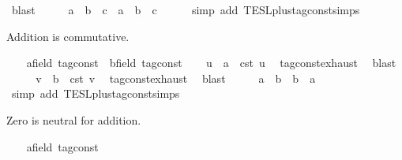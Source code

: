 \begin{isabellebody}
\ blast\isanewline
\ \ \isamarkupfalse%
\ \isamarkupfalse%
\ {\isacartoucheopen}a\ {\isacharplus}\ b\ {\isacharplus}\ c\ {\isacharequal}\ a\ {\isacharplus}\ {\isacharparenleft}b\ {\isacharplus}\ c{\isacharparenright}{\isacartoucheclose}\isanewline
\ \ \ \ \isamarkupfalse%
\ {\isacharparenleft}simp\ add{\isacharcolon}\ TESL{\isachardot}plus{\isacharunderscore}tag{\isacharunderscore}const{\isachardot}simps{\isacharparenright}\isanewline
{}\isamarkupfalse%
%
\begin{isamarkuptext}%
Addition is commutative.%
\end{isamarkuptext}\isamarkuptrue%
\ \ \isamarkupfalse%
\ a{\isacharcolon}{\isacharcolon}{\isacartoucheopen}{\isacharprime}{\isasymtau}{\isacharcolon}{\isacharcolon}field\ tag{\isacharunderscore}const{\isacartoucheclose}\ \ b{\isacharcolon}{\isacharcolon}{\isacartoucheopen}{\isacharprime}{\isasymtau}{\isacharcolon}{\isacharcolon}field\ tag{\isacharunderscore}const{\isacartoucheclose}\isanewline
\ \ \isamarkupfalse%
\ u\ \ {\isacartoucheopen}a\ {\isacharequal}\ {\isasymtau}\isactrlsub c\isactrlsub s\isactrlsub t\ u{\isacartoucheclose}\ \isamarkupfalse%
\ tag{\isacharunderscore}const{\isachardot}exhaust\ \isamarkupfalse%
\ blast\isanewline
\ \ \isamarkupfalse%
\ \isamarkupfalse%
\ v\ \ {\isacartoucheopen}b\ {\isacharequal}\ {\isasymtau}\isactrlsub c\isactrlsub s\isactrlsub t\ v{\isacartoucheclose}\ \isamarkupfalse%
\ tag{\isacharunderscore}const{\isachardot}exhaust\ \isamarkupfalse%
\ blast\isanewline
\ \ \isamarkupfalse%
\ \isamarkupfalse%
\ {\isacartoucheopen}a\ {\isacharplus}\ b\ {\isacharequal}\ b\ {\isacharplus}\ a{\isacartoucheclose}\isanewline
\ \ \ \ \isamarkupfalse%
\ {\isacharparenleft}simp\ add{\isacharcolon}\ TESL{\isachardot}plus{\isacharunderscore}tag{\isacharunderscore}const{\isachardot}simps{\isacharparenright}\isanewline
{}\isamarkupfalse%
%
\begin{isamarkuptext}%
Zero is neutral for addition.%
\end{isamarkuptext}\isamarkuptrue%
\ \ \isamarkupfalse%
\ a{\isacharcolon}{\isacharcolon}{\isacartoucheopen}{\isacharprime}{\isasymtau}{\isacharcolon}{\isacharcolon}field\ tag{\isacharunderscore}const{\isacartoucheclose}\isanewline
\ \ \isamarkupfalse%

\end{isabellebody}
